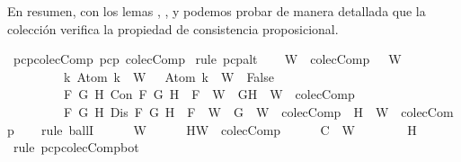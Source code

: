 \begin{isabellebody}
\begin{isamarkuptext}
En resumen, con los lemas , ,  y
   podemos probar de manera detallada que la colección  verifica la propiedad 
  de consistencia proposicional.%
\end{isamarkuptext}\isamarkuptrue%
\isamarkupfalse%
\ pcp{\isacharunderscore}colecComp{\isacharcolon}\ {\isachardoublequoteopen}pcp\ colecComp{\isachardoublequoteclose}\isanewline
%
\isadelimproof
%
\endisadelimproof
%
\isatagproof
{}\isamarkupfalse%
\ {\isacharparenleft}rule\ pcp{\isacharunderscore}alt{}{\isacharparenright}\isanewline
\ \ \isamarkupfalse%
\ {\isachardoublequoteopen}{\isasymforall}W\ {\isasymin}\ colecComp{\isachardot}\ {\isasymbottom}\ {\isasymnotin}\ W\isanewline
\ \ \ \ \ \ \ \ {\isasymand}\ {\isacharparenleft}{\isasymforall}k{\isachardot}\ Atom\ k\ {\isasymin}\ W\ {\isasymlongrightarrow}\ \isactrlbold {\isasymnot}\ {\isacharparenleft}Atom\ k{\isacharparenright}\ {\isasymin}\ W\ {\isasymlongrightarrow}\ False{\isacharparenright}\isanewline
\ \ \ \ \ \ \ \ {\isasymand}\ {\isacharparenleft}{\isasymforall}F\ G\ H{\isachardot}\ Con\ F\ G\ H\ {\isasymlongrightarrow}\ F\ {\isasymin}\ W\ {\isasymlongrightarrow}\ {\isacharbraceleft}G{\isacharcomma}H{\isacharbraceright}\ {\isasymunion}\ W\ {\isasymin}\ colecComp{\isacharparenright}\isanewline
\ \ \ \ \ \ \ \ {\isasymand}\ {\isacharparenleft}{\isasymforall}F\ G\ H{\isachardot}\ Dis\ F\ G\ H\ {\isasymlongrightarrow}\ F\ {\isasymin}\ W\ {\isasymlongrightarrow}\ {\isacharbraceleft}G{\isacharbraceright}\ {\isasymunion}\ W\ {\isasymin}\ colecComp\ {\isasymor}\ {\isacharbraceleft}H{\isacharbraceright}\ {\isasymunion}\ W\ {\isasymin}\ colecComp{\isacharparenright}{\isachardoublequoteclose}\isanewline
\ \ \isamarkupfalse%
\ {\isacharparenleft}rule\ ballI{\isacharparenright}\isanewline
\ \ \ \ \isamarkupfalse%
\ W\isanewline
\ \ \ \ \isamarkupfalse%
\ H{\isacharcolon}{\isachardoublequoteopen}W\ {\isasymin}\ colecComp{\isachardoublequoteclose}\isanewline
\ \ \ \ \isamarkupfalse%
\ C{}{\isacharcolon}{\isachardoublequoteopen}{\isasymbottom}\ {\isasymnotin}\ W{\isachardoublequoteclose}\isanewline
\ \ \ \ \ \ \isamarkupfalse%
\ H\ \isamarkupfalse%
\ {\isacharparenleft}rule\ pcp{\isacharunderscore}colecComp{\isacharunderscore}bot{\isacharparenright}\isanewline

\end{isabellebody}
